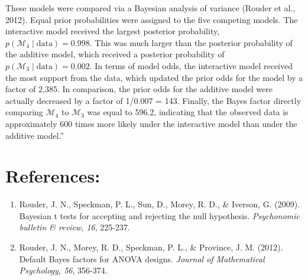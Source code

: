 \documentclass[11pt]{article}
\begin{document}
These models were compared via a Bayesian analysis of variance (Rouder et al., 2012).  Equal prior probabilities were assigned to the five competing models.  The interactive model received the largest posterior probability, \(p(\mathcal{M}_4\mid \text{data}) = 0.998\).  This was much larger than the posterior probability of the additive model, which received a posterior probability of \(p(\mathcal{M}_3\mid \text{data})=0.002\). In terms of model odds, the interactive model received the most support from the data, which updated the prior odds for the model by a factor of 2,385.  In comparison, the prior odds for the additive model were actually decreased by a factor of 1/0.007 = 143.  Finally, the Bayes factor directly comparing \(\mathcal{M}_4\) to \(\mathcal{M}_3\) was equal to 596.2, indicating that the observed data is approximately 600 times more likely under the interactive model than under the additive model.''

\section*{References:}
\label{sec:org9984a7b}

\begin{enumerate}
\item Rouder, J. N., Speckman, P. L., Sun, D., Morey, R. D., \& Iverson, G. (2009). Bayesian t tests for accepting and rejecting the null hypothesis. \emph{Psychonomic bulletin \& review, 16}, 225-237.
\item Rouder, J. N., Morey, R. D., Speckman, P. L., \& Province, J. M. (2012). Default Bayes factors for ANOVA designs. \emph{Journal of Mathematical Psychology, 56}, 356-374.
\end{enumerate}
\end{document}
